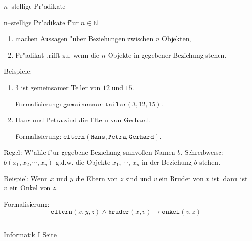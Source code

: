 \begin{slide}{}
\normalsize
\begin{center}
$n$--stellige Pr"adikate
\end{center}
\vspace{0.5cm}

\footnotesize
\footnotesize
n--stellige Pr"adikate f"ur $n\in \mathbb{N}$
\begin{enumerate}
\item machen Aussagen "uber Beziehungen zwischen $n$ Objekten,
\item Pr"adikat trifft zu, wenn die $n$ Objekte in gegebener Beziehung stehen.
\end{enumerate}

Beispiele:
\begin{enumerate}
\item $3$ ist gemeinsamer Teiler von $12$ und  $15$.

      Formalisierung: $\mathtt{gemeinsamer\_teiler}(3,12,15)$. 
      
\item Hans und Petra sind die Eltern von Gerhard.

      Formalisierung: $\mathtt{eltern}(\mathtt{Hans}, \mathtt{Petra}, \mathtt{Gerhard})$.
\end{enumerate}
Regel: W"ahle f"ur gegebene Beziehung sinnvollen Namen $b$.
Schreibweise: \\[0.3cm]
\hspace*{1.3cm} 
$b(x_1,x_2, \cdots, x_n)$ g.d.w. die Objekte $x_1$, $\cdots$, $x_n$
\hspace*{1.3cm}  in der Beziehung $b$ stehen.

Beispiel: Wenn $x$ und $y$ die Eltern von $z$ sind und $v$ ein Bruder von $x$ ist, dann
ist $v$ ein Onkel von $z$.

Formalisierung:
$$ \mathtt{eltern}(x, y, z) \wedge \mathtt{bruder}(x, v) \rightarrow \mathtt{onkel}(v, z)$$


\vspace*{\fill}
\tiny \addtocounter{mypage}{1}
\rule{15cm}{1mm}
Informatik I  \hspace*{\fill} Seite 
\end{slide}


